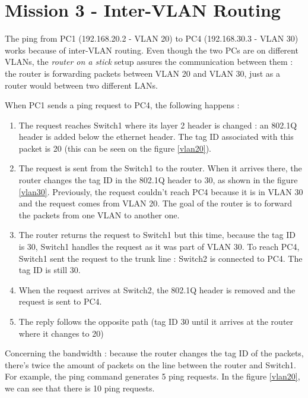 \documentclass[10pt,a4paper]{ULBreport}
\begin{document}
\chapter{Mission 3 - Inter-VLAN Routing}



The ping from PC1 (192.168.20.2 - VLAN 20) to PC4 (192.168.30.3 - VLAN 30) works because of inter-VLAN routing. Even though the two PCs are on different VLANs, the \textit{router on a stick} setup assures the communication between them : the router is forwarding packets between VLAN 20 and VLAN 30, just as a router would between two different LANs.

\par

When PC1 sends a ping request to PC4, the following happens :

\begin{enumerate}
    \item The request reaches Switch1 where its layer 2 header is changed : an 802.1Q header is added below the ethernet header. The tag ID associated with this packet is 20 (this can be seen on the figure \ref{vlan20}).
    \item The request is sent from the Switch1 to the router. When it arrives there, the router changes the tag ID in the 802.1Q header to 30, as shown in the figure \ref{vlan30}. Previously, the request couldn't reach PC4 because it is in VLAN 30 and the request comes from VLAN 20. The goal of the router is to forward the packets from one VLAN to another one.
    \item The router returns the request to Switch1 but this time, because the tag ID is 30, Switch1 handles the request as it was part of VLAN 30. To reach PC4, Switch1 sent the request to the trunk line : Switch2 is connected to PC4. The tag ID is still 30.  
    \item When the request arrives at Switch2, the 802.1Q header is removed and the request is sent to PC4.
    \item The reply follows the opposite path (tag ID 30 until it arrives at the router where it changes to 20)
\end{enumerate}

Concerning the bandwidth : because the router changes the tag ID of the packets, there's twice the amount of packets on the line between the router and Switch1. For example, the ping command generates 5 ping requests. In the figure \ref{vlan20}, we can see that there is 10 ping requests.
\end{document}
